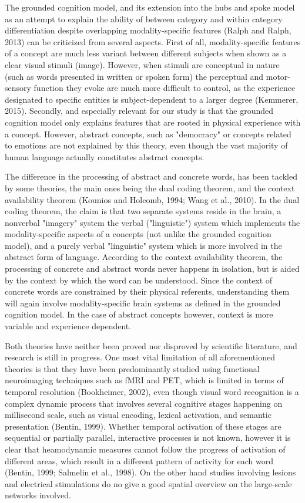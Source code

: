 The grounded cognition model, and its extension into the hubs and spoke model as an attempt to explain the ability of between category and within category differentiation despite overlapping modality-specific features (Ralph and Ralph, 2013)  can be criticized from several aspects. First of all, modality-specific features of a concept are much less variant between different subjects when shown as a clear visual stimuli (image). However, when stimuli are conceptual in nature (such as words presented in written or spoken form) the perceptual and motor-sensory function they evoke are much more difficult to control, as the experience designated to specific entities is subject-dependent to a larger degree (Kemmerer, 2015). Secondly, and especially relevant for our study is that the grounded cognition model only explains features that are rooted in physical experience with a concept. However, abstract concepts, such as "democracy" or concepts related to emotions are not explained by this theory, even though the vast majority of human language actually constitutes abstract concepts.

The difference in the processing of abstract and concrete words, has been tackled by some theories, the main ones being the dual coding theorem, and the context availability theorem (Kounios and Holcomb, 1994; Wang et al., 2010). In the dual coding theorem, the claim is that two separate systems reside in the brain, a nonverbal "imagery" system the verbal ("linguistic") system which implements the modality-specific aspects of a concepts (not unlike the grounded cognition model), and a purely verbal "linguistic" system which is more involved in the abstract form of language. According to the context availability theorem, the processing of concrete and abstract words never happens in isolation, but is aided by the context by which the word can be understood. Since the context of concrete words are constrained by their physical referents, understanding them will again involve modality-specific brain systems as defined in the grounded cognition model. In the case of abstract concepts however, context is more variable and experience dependent. 

Both theories have neither been proved nor disproved by scientific literature, and research is still in progress. One most vital limitation of all aforementioned theories is that they have been predominantly studied using functional neuroimaging techniques such as fMRI and PET, which is limited in terms of temporal resolution (Bookheimer, 2002), even though visual word recognition is a complex dynamic process that involves several cognitive stages happening on millisecond scale, such as visual encoding, lexical activation, and semantic presentation (Bentin, 1999). Whether temporal activation of these stages are sequential or partially parallel, interactive processes is not known, however it is clear that heamodynamic measures cannot follow the progress of activation of different areas, which result in a different pattern of activity for each word (Bentin, 1999; Salmelin et al., 1998). On the other hand studies involving lesions and electrical stimulations do no give a good spatial overview on the large-scale networks involved.

